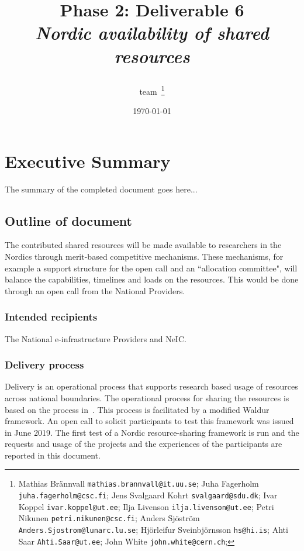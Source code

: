 \documentclass{article}
\title{
{\bf \dell Phase 2: Deliverable 6} \\
{\it Nordic availability of shared resources}
\author{\dell team~\footnote{ %
Mathias Br{\"a}nnvall {\tt mathias.brannvall@it.uu.se};
Juha Fagerholm {\tt juha.fagerholm@csc.fi};
Jens Svalgaard Kohrt {\tt svalgaard@sdu.dk};
Ivar Koppel {\tt ivar.koppel@ut.ee};
Ilja Livenson {\tt ilja.livenson@ut.ee};
Petri Nikunen {\tt petri.nikunen@csc.fi};
Anders Sj{\"o}str{\"o}m {\tt Anders.Sjostrom@lunarc.lu.se};
Hj{\"o}rleifur Sveinbj{\"o}rnsson {\tt hs@hi.is};
Ahti Saar {\tt Ahti.Saar@ut.ee};
John White {\tt john.white@cern.ch};
}}}
\date{\today}
\newcommand{\dell}{Dellingr\xspace}
\newcommand{\einfra}{e-infrastructure\xspace}
\newcommand{\pilot}{first test of a Nordic resource-sharing framework\xspace}
\begin{document}
\pagestyle{fancy}
\lhead{{\bf \dell Project}}

\maketitle

\newpage
\tableofcontents
\newpage

\section{Executive Summary}

The summary of the completed document goes here...

\subsection{Outline of document}

The contributed shared resources will be made available to researchers in the Nordics through merit-based competitive mechanisms. These mechanisms, for example a support structure for the open call and an ``allocation committee", will balance the capabilities, timelines and loads on the resources. This would be done through an open call from the National Providers.

\subsubsection{Intended recipients}

The National \einfra Providers and NeIC. 

\subsubsection{Delivery process}

Delivery is an operational process that supports research based usage of resources across national boundaries. 
The operational process for sharing the resources is based on the process in~\cite{dellingr-p2-do5}.
This process is facilitated by a modified Waldur~\cite{waldur} framework.
An open call to solicit participants to test this framework was issued in June 2019.
The \pilot is run and the requests and usage of the projects and the experiences of the participants are reported in this document.
\end{document}
